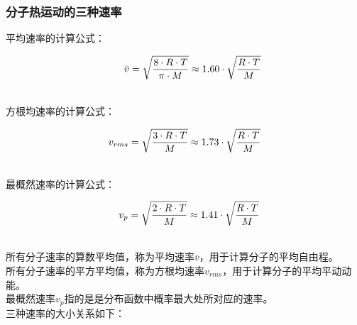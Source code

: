 \documentclass[UTF8]{ctexart}
\begin{document}
\newpage

\subsubsection{分子热运动的三种速率}
    平均速率的计算公式：
    \begin{large}
        \begin{equation*}
            ~~~~~\bar{v}=\sqrt{\frac{8\cdot R\cdot T}{\pi\cdot M}}\approx 1.60\cdot\sqrt{\frac{R\cdot T}{M}}\\[3mm]
        \end{equation*}
    \end{large}\\
    方根均速率的计算公式：
    \begin{large}
        \begin{equation*}
            v_{rms}=\sqrt{\frac{3\cdot R\cdot T}{M}}\approx 1.73\cdot\sqrt{\frac{R\cdot T}{M}}\\[3mm]
        \end{equation*}
    \end{large}\\
    最概然速率的计算公式：
    \begin{large}
        \begin{equation*}
            ~~~v_{p}=\sqrt{\frac{2\cdot R\cdot T}{M}}\approx 1.41\cdot\sqrt{\frac{R\cdot T}{M}}\\[3mm]
        \end{equation*}
    \end{large}\\
    所有分子速率的算数平均值，称为平均速率$\bar{v}$，用于计算分子的平均自由程。\\[3mm]
    所有分子速率的平方平均值，称为方根均速率$v_{rms}$，用于计算分子的平均平动动能。\\[3mm]
    最概然速率$v_p$指的是是分布函数中概率最大处所对应的速率。\\[6mm]
    三种速率的大小关系如下：
\end{document}
